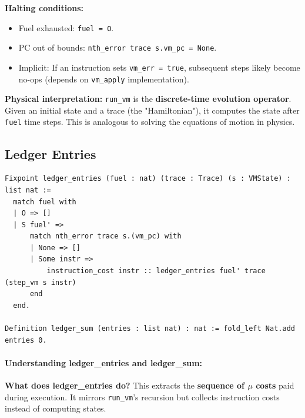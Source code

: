 \textbf{Halting conditions:}
\begin{itemize}
    \item Fuel exhausted: \texttt{fuel = O}.
    \item PC out of bounds: \texttt{nth\_error trace s.vm\_pc = None}.
    \item Implicit: If an instruction sets \texttt{vm\_err = true}, subsequent steps likely become no-ops (depends on \texttt{vm\_apply} implementation).
\end{itemize}


\textbf{Physical interpretation:} \texttt{run\_vm} is the \textbf{discrete-time evolution operator}. Given an initial state and a trace (the "Hamiltonian"), it computes the state after \texttt{fuel} time steps. This is analogous to solving the equations of motion in physics.

\subsection{Ledger Entries}

\begin{lstlisting}
Fixpoint ledger_entries (fuel : nat) (trace : Trace) (s : VMState) : list nat :=
  match fuel with
  | O => []
  | S fuel' =>
      match nth_error trace s.(vm_pc) with
      | None => []
      | Some instr =>
          instruction_cost instr :: ledger_entries fuel' trace (step_vm s instr)
      end
  end.

Definition ledger_sum (entries : list nat) : nat := fold_left Nat.add entries 0.
\end{lstlisting}

\paragraph{Understanding ledger\_entries and ledger\_sum:}

\textbf{What does ledger\_entries do?} This extracts the \textbf{sequence of $\mu$ costs} paid during execution. It mirrors \texttt{run\_vm}'s recursion but collects instruction costs instead of computing states.

